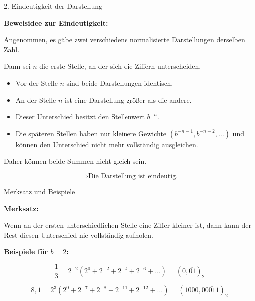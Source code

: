 \documentclass{beamer}
\begin{document}
\begin{frame}{2. Eindeutigkeit der Darstellung}

\textbf{Beweisidee zur Eindeutigkeit:}

Angenommen, es gäbe zwei verschiedene normalisierte Darstellungen derselben Zahl.

\vspace{0.4cm}

Dann sei \(n\) die erste Stelle, an der sich die Ziffern unterscheiden.

\begin{itemize}
    \item Vor der Stelle \(n\) sind beide Darstellungen identisch.
    
    \item An der Stelle \(n\) ist eine Darstellung größer als die andere.
    
    \item Dieser Unterschied besitzt den Stellenwert \(b^{-n}\).
    
    \item Die späteren Stellen haben nur kleinere Gewichte
    \(\left(b^{-n-1}, b^{-n-2}, \dots \right)\)
    und können den Unterschied nicht mehr vollständig ausgleichen.
\end{itemize}

\vspace{0.5cm}

Daher können beide Summen nicht gleich sein.

\[
\Rightarrow \text{Die Darstellung ist eindeutig.}
\]

\end{frame}

\begin{frame}{Merksatz und Beispiele}

\textbf{Merksatz:}

Wenn an der ersten unterschiedlichen Stelle eine Ziffer kleiner ist, dann kann der Rest diesen Unterschied nie vollständig aufholen.

\vspace{0.6cm}

\textbf{Beispiele für \(b=2\):}

\[
\frac{1}{3}
=
2^{-2}\left(2^0+2^{-2}+2^{-4}+2^{-6}+\dots\right)
=
(0,\overline{01})_2
\]

\vspace{0.6cm}

\[
8{,}1
=
2^3\left(2^0+2^{-7}+2^{-8}+2^{-11}+2^{-12}+\dots\right)
=
(1000,0\overline{0011})_2
\]

\end{frame}
\end{document}
